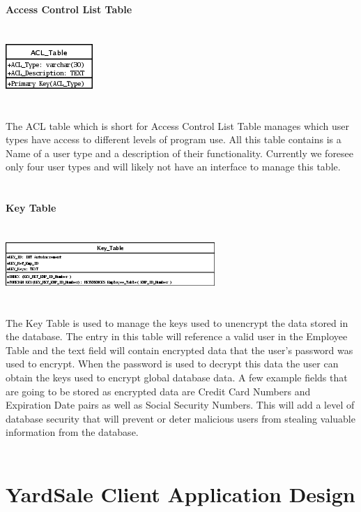 \documentclass{report}
\begin{document}
	{\bf Access Control List Table}\\
	\\
	\\
	\includegraphics{Tables/ACL.png}\\
	\\
	\\
	The ACL table which is short for Access Control List Table manages which user types have access
	to different levels of program use. All this table contains is a Name of a user type and a description
	of their functionality. Currently we foresee only four user types and will likely not have an
	interface to manage this table.\\
	\\
	\\
	{\bf Key Table}\\
	\\
	\\
	\includegraphics{Tables/KeyTable.png}\\
	\\
	\\
	The Key Table is used to manage the keys used to unencrypt the data stored in the database. The
	entry in this table will reference a valid user in the Employee Table and the text field will
	contain encrypted data that the user's password was used to encrypt. When the password is used
	to decrypt this data the user can obtain the keys used to encrypt global database data. A few
	example fields that are going to be stored as encrypted data are Credit Card Numbers and Expiration
	Date pairs as well as Social Security Numbers. This will add a level of database security that
	will prevent or deter malicious users from stealing valuable information from the database.\\
	\\

	\newpage

	\section{YardSale Client Application Design}
\end{document}
